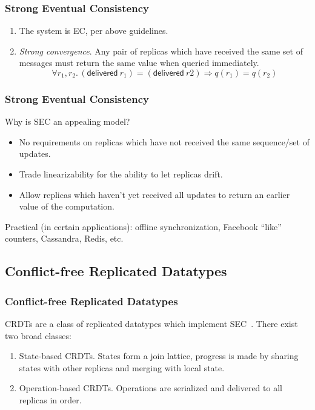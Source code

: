 \documentclass[aspectratio=169,compress,handout]{beamer}
\newcommand*{\CRDTs}{\textsf{CRDTs}\xspace}
\newcommand*{\EC}{\textsf{EC}\xspace}
\newcommand*{\SEC}{\textsf{SEC}\xspace}
\begin{document}
  \begin{frame}
    \frametitle{Strong Eventual Consistency}

    \begin{definition}
      \begin{enumerate}[<+->]
        \item The system is \EC, per above guidelines.
        \item \emph{Strong convergence}. Any pair of replicas which have
          received the same set of messages must return the same value when
          queried immediately.
          \[
            \forall r_1, r_2.\, (\textsf{delivered}~r_1) =
              (\textsf{delivered}~r2) \Rightarrow q(r_1) = q(r_2)
          \]
      \end{enumerate}
    \end{definition}
  \end{frame}

  \begin{frame}
    \frametitle{Strong Eventual Consistency}

    Why is \SEC an appealing model?
    \begin{itemize}[<+->]
      \item No requirements on replicas which have not received the same
        sequence/set of updates.
      \item Trade linearizability for the ability to let replicas drift.
      \item Allow replicas which haven't yet received all updates to return an
        earlier value of the computation.
    \end{itemize}

    \pause
    Practical (in certain applications): offline synchronization, Facebook
    ``like'' counters, Cassandra, Redis, etc.
  \end{frame}

  \subsection{Conflict-free Replicated Datatypes}
  \begin{frame}
    \frametitle{Conflict-free Replicated Datatypes}

    \CRDTs are a class of replicated datatypes which implement
    \SEC~\cite{shapiro11}. There exist two broad classes:
    \begin{enumerate}[<+->]
      \item State-based \CRDTs. States form a join lattice, progress is made by
        sharing states with other replicas and merging with local state.
      \item Operation-based \CRDTs. Operations are serialized and delivered to
        all replicas in order.
    \end{enumerate}
  \end{frame}
\end{document}
